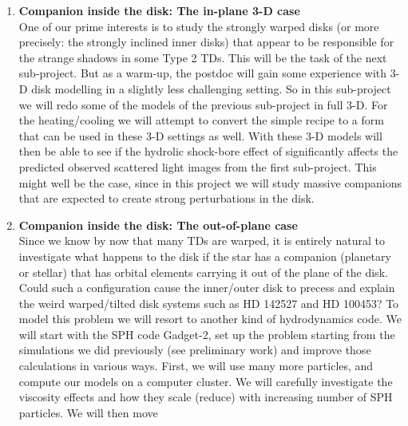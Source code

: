 \documentclass[10pt,fleqn,twoside]{article}
\begin{document}
\begin{enumerate}
{  which we wish to avoid, to save time for the following sub-projects.}
\item {\bf Companion inside the disk: The in-plane 3-D case}\label{subproj-inplane-3d}\\
  One of our prime interests is to study the strongly warped disks (or more
  precisely: the strongly inclined inner disks) that appear to be
  responsible for the strange shadows in some Type 2 TDs. This will be
  the task of the next sub-project. But as a warm-up, the postdoc will gain
  some experience with 3-D disk modelling in a slightly less challenging
  setting.  So in this sub-project we will redo some of the models of the
  previous sub-project in full 3-D. For the heating/cooling we will attempt
  to convert the simple recipe to a form that can be used in these 3-D
  settings as well.  With these 3-D models will then be able to see if the
  hydrolic shock-bore effect of \citep{2006ApJ...641..534B} \citep[and
  discussed in the context of observability of spiral waves
  in][]{2015ApJ...809L...5D} significantly affects the predicted observed
  scattered light images from the first sub-project. This might well be the
  case, since in this project we will study massive companions that are
  expected to create strong perturbations in the disk.  
\item {\bf Companion inside the disk: The out-of-plane case}\label{subproj-inclined-3d}\\
  Since we know by now that many TDs are warped, it is entirely natural to
  investigate what happens to the disk if the star has a companion
  (planetary or stellar) that has orbital elements carrying it out of the
  plane of the disk. Could such a configuration cause the inner/outer disk
  to precess and explain the weird warped/tilted disk systems such as HD
  142527 and HD 100453? To model this problem we will resort to another kind
  of hydrodynamics code. We will start with the SPH code Gadget-2, set up
  the problem starting from the simulations we did previously (see
  preliminary work) and improve those calculations in various ways.  First,
  we will use many more particles, and compute our models on a computer
  cluster. We will carefully investigate the viscosity effects and how they
  scale (reduce) with increasing number of SPH particles.  We will then move

\end{enumerate}
\end{document}
